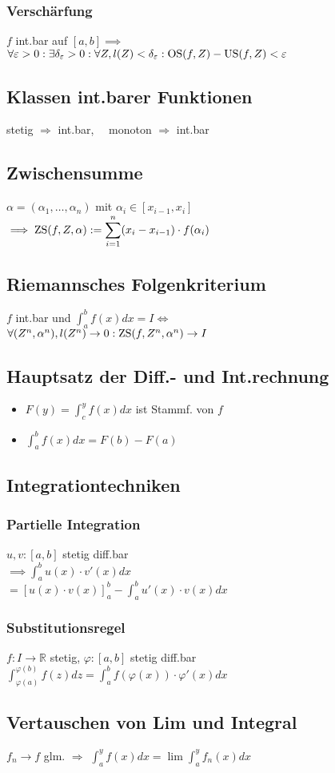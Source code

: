 \subsubsection*{Verschärfung}
$f$ int.bar auf $[a,b] \implies$ \\
$\forall \varepsilon>0:\exists \delta_\varepsilon>0: \forall Z, l(Z)<\delta_\varepsilon: \operatorname{OS}(f,Z)-\operatorname{US}(f,Z)<\varepsilon$

\subsection*{Klassen int.barer Funktionen}
stetig $\Rightarrow$ int.bar,~~
monoton $\Rightarrow$ int.bar

\subsection*{Zwischensumme}
$\alpha=(\alpha_1,\ldots,\alpha_n)$ mit $\alpha_i\in[x_{i-1},x_i]$ \\
$\displaystyle \implies \operatorname{ZS}(f,Z,\alpha) := \sum_{i=1}^n(x_i-x_{i-1})\cdot f(\alpha_i)$

\subsection*{Riemannsches Folgenkriterium}
$f$ int.bar und $\int_a^bf(x)dx=I \iff$ \\
$\forall(Z^n,\alpha^n), l(Z^n)\to0: \operatorname{ZS}(f,Z^n,\alpha^n)\to I$

\subsection*{Hauptsatz der Diff.- und Int.rechnung}
\begin{itemize}
	\item $F(y)=\int_c^yf(x)dx$ ist Stammf. von $f$
	\item $\int_a^bf(x)dx=F(b)-F(a)$
\end{itemize}

\subsection*{Integrationtechniken}

\subsubsection*{Partielle Integration}
$u,v:[a,b]$ stetig diff.bar \\
$\implies \int_a^bu(x)\cdot v'(x)dx$\\ $= [u(x)\cdot v(x)]_a^b - \int_a^bu'(x)\cdot v(x)dx$

\subsubsection*{Substitutionsregel}
$f:I\to\mathbb{R}$ stetig, $\varphi:[a,b]$ stetig diff.bar \\
$\int_{\varphi(a)}^{\varphi(b)}f(z)dz = \int_a^bf(\varphi(x))\cdot\varphi'(x)dx$

\subsection*{Vertauschen von Lim und Integral}
$f_n\to f$ glm. $\Rightarrow$
$\int_a^yf(x)dx=\lim\int_a^yf_n(x)dx$
